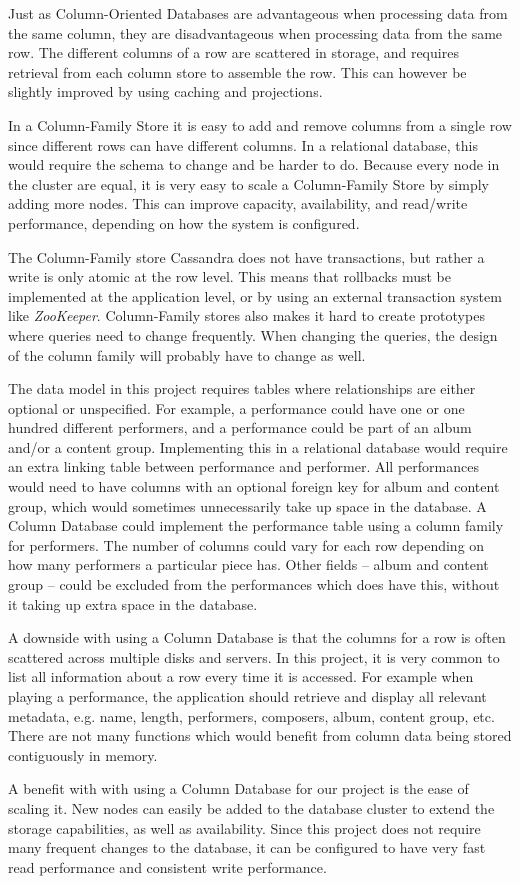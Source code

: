 Just as Column-Oriented Databases are advantageous when processing data from the same column, they are disadvantageous when processing data from the same row. The different columns of a row are scattered in storage, and requires retrieval from each column store to assemble the row. This can however be slightly improved by using caching and projections.

In a Column-Family Store it is easy to add and remove columns from a single row since different rows can have different columns. In a relational database, this would require the schema to change and be harder to do.
Because every node in the cluster are equal, it is very easy to scale a Column-Family Store by simply adding more nodes. This can improve capacity, availability, and read/write performance, depending on how the system is configured.

The Column-Family store Cassandra does not have transactions, but rather a write is only atomic at the row level. This means that rollbacks must be implemented at the application level, or by using an external transaction system like \emph{ZooKeeper}.
Column-Family stores also makes it hard to create prototypes where queries need to change frequently. When changing the queries, the design of the column family will probably have to change as well.

The data model in this project requires tables where relationships are either optional or unspecified. For example, a performance could have one or one hundred different performers, and a performance could be part of an album and/or a content group. Implementing this in a relational database would require an extra linking table between performance and performer. All performances would need to have columns with an optional foreign key for album and content group, which would sometimes unnecessarily take up space in the database. A Column Database could implement the performance table using a column family for performers. The number of columns could vary for each row depending on how many performers a particular piece has. Other fields -- album and content group -- could be excluded from the performances which does have this, without it taking up extra space in the database.

A downside with using a Column Database is that the columns for a row is often scattered across multiple disks and servers. In this project, it is very common to list all information about a row every time it is accessed. For example when playing a performance, the application should retrieve and display all relevant metadata, e.g. name, length, performers, composers, album, content group, etc. There are not many functions which would benefit from column data being stored contiguously in memory.

A benefit with with using a Column Database for our project is the ease of scaling it. New nodes can easily be added to the database cluster to extend the storage capabilities, as well as availability. Since this project does not require many frequent changes to the database, it can be configured to have very fast read performance and consistent write performance.
